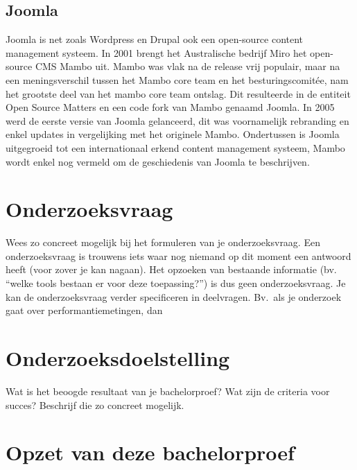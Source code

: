 \subsection{Joomla}
Joomla is net zoals Wordpress en Drupal ook een open-source content management systeem. In 2001 brengt het Australische bedrijf Miro het open-source CMS Mambo uit. Mambo was vlak na de release vrij populair, maar na een meningsverschil tussen het Mambo core team en het besturingscomitée, nam het grootste deel van het mambo core team ontslag. Dit resulteerde in de entiteit Open Source Matters en een code fork van Mambo genaamd Joomla. In 2005 werd de eerste versie van Joomla gelanceerd, dit was voornamelijk rebranding en enkel updates in vergelijking met het originele Mambo. Ondertussen is Joomla uitgegroeid tot een internationaal erkend content management systeem, Mambo wordt enkel nog vermeld om de geschiedenis van Joomla te beschrijven.\autocite{Crowder2009} 


\section{Onderzoeksvraag}
\label{sec:onderzoeksvraag}

Wees zo concreet mogelijk bij het formuleren van je onderzoeksvraag. Een onderzoeksvraag is trouwens iets waar nog niemand op dit moment een antwoord heeft (voor zover je kan nagaan). Het opzoeken van bestaande informatie (bv. ``welke tools bestaan er voor deze toepassing?'') is dus geen onderzoeksvraag. Je kan de onderzoeksvraag verder specificeren in deelvragen. Bv.~als je onderzoek gaat over performantiemetingen, dan 

\section{Onderzoeksdoelstelling}
\label{sec:onderzoeksdoelstelling}

Wat is het beoogde resultaat van je bachelorproef? Wat zijn de criteria voor succes? Beschrijf die zo concreet mogelijk.

\section{Opzet van deze bachelorproef}
\label{sec:opzet-bachelorproef}


